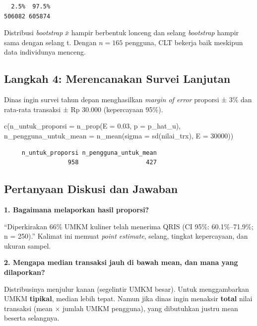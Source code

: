 \documentclass[
  indonesian,
  letterpaper,
]{book}
\newenvironment{Shaded}{\begin{snugshade}}{\end{snugshade}}
\newcommand{\AttributeTok}[1]{\textcolor[rgb]{0.40,0.45,0.13}{#1}}
\newcommand{\DecValTok}[1]{\textcolor[rgb]{0.68,0.00,0.00}{#1}}
\newcommand{\FloatTok}[1]{\textcolor[rgb]{0.68,0.00,0.00}{#1}}
\newcommand{\FunctionTok}[1]{\textcolor[rgb]{0.28,0.35,0.67}{#1}}
\newcommand{\NormalTok}[1]{\textcolor[rgb]{0.00,0.23,0.31}{#1}}
\begin{document}
\begin{verbatim}
  2.5%  97.5% 
506082 605874 
\end{verbatim}

Distribusi \emph{bootstrap} \(\bar{x}\) hampir berbentuk lonceng dan
selang \emph{bootstrap} hampir sama dengan selang t. Dengan \(n = 165\)
pengguna, CLT bekerja baik meskipun data individunya menceng.

\subsection{Langkah 4: Merencanakan Survei
Lanjutan}\label{langkah-4-merencanakan-survei-lanjutan}

Dinas ingin survei tahun depan menghasilkan \emph{margin of error}
proporsi ± 3\% dan rata-rata transaksi ± Rp 30.000 (kepercayaan 95\%).

\begin{Shaded}
\begin{Highlighting}[]
\FunctionTok{c}\NormalTok{(}\AttributeTok{n\_untuk\_proporsi =} \FunctionTok{n\_prop}\NormalTok{(}\AttributeTok{E =} \FloatTok{0.03}\NormalTok{, }\AttributeTok{p =}\NormalTok{ p\_hat\_u),}
  \AttributeTok{n\_pengguna\_untuk\_mean =} \FunctionTok{n\_mean}\NormalTok{(}\AttributeTok{sigma =} \FunctionTok{sd}\NormalTok{(nilai\_trx), }\AttributeTok{E =} \DecValTok{30000}\NormalTok{))}
\end{Highlighting}
\end{Shaded}

\begin{verbatim}
     n_untuk_proporsi n_pengguna_untuk_mean 
                  958                   427 
\end{verbatim}

\subsection{Pertanyaan Diskusi dan
Jawaban}\label{pertanyaan-diskusi-dan-jawaban}

\textbf{1. Bagaimana melaporkan hasil proporsi?}

``Diperkirakan 66\% UMKM kuliner telah menerima QRIS (CI 95\%:
60.1\%--71.9\%; n = 250).'' Kalimat ini memuat \emph{point estimate},
selang, tingkat kepercayaan, dan ukuran sampel.

\textbf{2. Mengapa median transaksi jauh di bawah mean, dan mana yang
dilaporkan?}

Distribusinya menjulur kanan (segelintir UMKM besar). Untuk
menggambarkan UMKM \textbf{tipikal}, median lebih tepat. Namun jika
dinas ingin menaksir \textbf{total} nilai transaksi (mean × jumlah UMKM
pengguna), yang dibutuhkan justru mean beserta selangnya.
\end{document}
